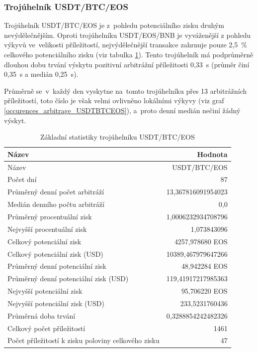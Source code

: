 \documentclass[thesis=B,czech]{FITthesis}[2019/03/21]
\begin{document}
\subsubsection{Trojúhelník USDT/BTC/EOS}
Trojúhelník USDT/BTC/EOS je z~pohledu potenciálního zisku druhým nevýdělečnějším. Oproti trojúhelníku USDT/EOS/BNB je vyváženější z pohledu výkyvů ve~velikosti příležitostí, nejvýdělečnější transakce zahrnuje pouze 2,5~\% celkového potenciálního zisku (viz tabulka \ref{USDTBTCEOS_stats}). Tento trojúhelník má podprůměrně dlouhou dobu trvání výskytu pozitivní arbitrážní příležitosti 0,33~s (průměr činí 0,35~s a medián 0,25~s). 

Průměrně se~v~každý den vyskytne na~tomto trojúhelníku přes 13 arbitrážních příležitostí, toto číslo je však velmi ovlivněno lokálními výkyvy (viz graf \ref{occurences_arbitrage_USDTBTCEOS}), a~proto denní medián nečiní žádný výskyt.

\begin{table}\centering
\caption{Základní statistiky trojúhelníku USDT/BTC/EOS}
\label{USDTBTCEOS_stats}
\begin{tabular}{|| l | r ||}
\hline Název & Hodnota \\ 
\hline\hline Název & USDT/BTC/EOS \\ 
\hline Počet dní & 87 \\ 
\hline Průměrný denní počet arbitráží & 13,367816091954023 \\ 
\hline Medián denního počtu arbitráží & 0,0 \\ 
\hline Průměrný procentuální zisk & 1,0006232934708796 \\ 
\hline Nejvyšší procentuální zisk & 1,073843096 \\ 
\hline Celkový potenciální zisk & 4257,978680 EOS \\ 
\hline Celkový potenciální zisk (USD) & 10389,467979647266 \\ 
\hline Průměrný denní potenciální zisk & 48,942284 EOS \\ 
\hline Průměrný denní potenciální zisk (USD) & 119,41917217985363 \\ 
\hline Nejvyšší potenciální zisk & 95,706220 EOS \\ 
\hline Nejvyšší potenciální zisk (USD) & 233,5231760436 \\ 
\hline Průměrná doba trvání & 0,3288854242482326 \\ 
\hline Celkový počet příležitostí & 1461 \\ 
\hline Počet příležitostí k zisku poloviny celkového zisku & 47 \\ 
\hline
\end{tabular}
\end{table}
\end{document}
